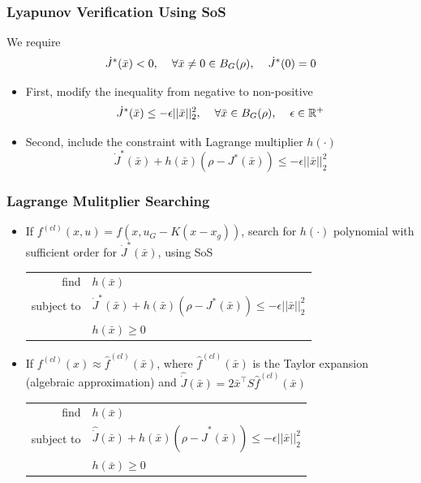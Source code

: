 \documentclass{beamer}
\begin{document}

\begin{frame}
\frametitle{Lyapunov Verification Using SoS}
We require 
\begin{equation*}
\dot{J}^{\ast}(\bar{x})<0, \hspace{.4cm} \forall\bar{x} \neq 0 \in B_G(\rho), \hspace{.4cm} \dot{J}^{\ast}(0)=0
\end{equation*} 
\begin{itemize}
\item First, modify the inequality from negative to non-positive 
\begin{equation*}
\dot{J}^{\ast}(\bar{x})\leq -\epsilon ||\bar{x}||_2^2, \hspace{.4cm} \forall \bar{x}\in B_G(\rho),\hspace{.4cm} \epsilon \in \mathbb{R}^+
\end{equation*}
\item Second, include the constraint with Lagrange multiplier $h(\cdot)$
\begin{equation*}
\dot{J}^{\ast}(\bar{x})+ h(\bar{x})(\rho - J^{\ast}(\bar{x}))\leq -\epsilon ||\bar{x}||_2^2
\end{equation*}
\end{itemize}
\end{frame}


\begin{frame}
\frametitle{Lagrange Mulitplier Searching}
\begin{itemize}
\item If $f^{(cl)}(x,u)=f(x,u_G-K(x-x_g))$, search for $h(\cdot)$ polynomial with sufficient order for $\dot{J}^{\ast}(\bar{x})$, using SoS
\begin{center}
\begin{tabular}{ r l }
find & $h(\bar{x})$ \\
subject to & $\dot{J}^{\ast}(\bar{x})+ h(\bar{x})(\rho - J^{\ast}(\bar{x}))\leq -\epsilon ||\bar{x}||_2^2$\\
 & $h(\bar{x})\geq 0$
\end{tabular}
\end{center}
\item If $f^{(cl)}(x)\approx \hat{f}^{(cl)}(\bar{x})$, where $\hat{f}^{(cl)}(\bar{x})$ is the Taylor expansion (algebraic approximation) and $\hat{\dot{J}}(\bar{x})=2\bar{x}^{\intercal}S\hat{f}^{(cl)}(\bar{x})$
\begin{center}
\begin{tabular}{ r l }
find & $h(\bar{x})$ \\
subject to & $\hat{\dot{J}}(\bar{x})+ h(\bar{x})(\rho - \hat{J}^{\ast}(\bar{x}))\leq -\epsilon ||\bar{x}||_2^2$\\
 & $h(\bar{x})\geq 0$
\end{tabular}
\end{center}
\end{itemize}

\end{frame}
\end{document}
